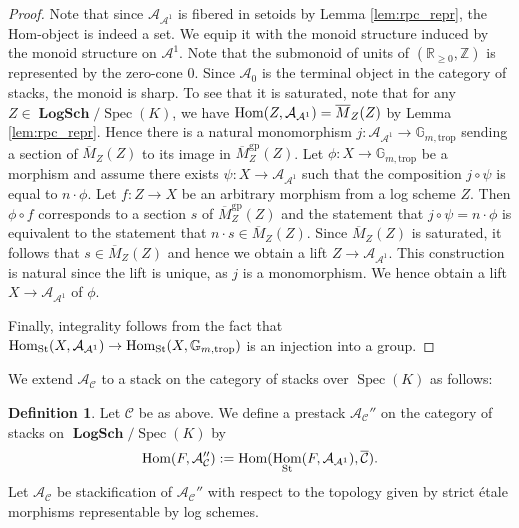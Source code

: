 \documentclass[11pt]{amsart}
\theoremstyle{definition}
\newtheorem{definition}[theorem]{Definition}
\theoremstyle{remark}
\DeclareMathOperator{\Spec}{Spec}
\def\gp{\mathrm{gp}}
\def\trop{\mathrm{trop}}
\DeclareMathOperator{\LogSch}{\mathbf{LogSch}}
\DeclareMathOperator{\Hom}{\textup{Hom}}
\begin{document}
\begin{proof}
	Note that since $\mathcal{A}_{\mathcal{A}^{1}}$ is fibered in
	setoids by Lemma \ref{lem:rpc_repr}, the Hom-object is indeed
	a set. We equip it with the monoid structure induced by
	the monoid structure on $\mathcal{A}^{1}$. Note that the submonoid
	of units of $(\mathbb{R}_{\ge 0},\mathbb{Z})$ is represented by
	the zero-cone $0$. Since $\mathcal{A}_{0}$ is the terminal object
	in the category of stacks, the monoid is sharp. To see that
	it is saturated, note that for any $Z\in \LogSch/\Spec(K)$,
	we have $\Hom(Z,\mathcal{A}_{\mathcal{A}^{1}})=\overline{M}_Z(Z)$
	by Lemma \ref{lem:rpc_repr}. Hence there is a natural monomorphism
	$j:\mathcal{A}_{\mathcal{A}^{1}}\to \mathbb{G}_{m,\trop}$ sending 
	a section of $\overline{M}_Z(Z)$ to its image in
	$\overline{M}^{\gp}_Z(Z)$. Let
	$\phi:X\to \mathbb{G}_{m,\trop}$ be a morphism and assume
	there exists $\psi:X\to \mathcal{A}_{\mathcal{A}^{1}}$ such
	that the composition $j\circ \psi$ is equal to $n\cdot \phi$.
	Let $f:Z\to X$ be an arbitrary morphism from a log scheme $Z$.
	Then $\phi\circ f$ corresponds to a section
	$s$ of $\overline{M}_Z^{\gp}(Z)$ and the statement that $j\circ \psi=n\cdot \phi$
	is equivalent to the statement that $n\cdot s\in \overline{M}_Z(Z)$.
	Since $\overline{M}_Z(Z)$ is saturated, it follows that
	$s\in \overline{M}_Z(Z)$ and hence we obtain a lift
	$Z\to \mathcal{A}_{\mathcal{A}^{1}}$. This construction is natural
	since the lift is unique, as $j$ is a monomorphism. We hence
	obtain a lift $X\to \mathcal{A}_{\mathcal{A}^{1}}$ of $\phi$.

	Finally, integrality follows from the fact that
	$\Hom_{\mathrm{St}}(X,\mathcal{A}_{\mathcal{A}^{1}})\to \Hom_{\mathrm{St}}(X,\mathbb{G}_{m,\trop})$
	is an injection into a group.
\end{proof}

We extend $\mathcal{A}_{\mathcal{C}}$ to a stack on the category of stacks over $\Spec(K)$ as follows:

\begin{definition}
	Let $\mathcal{C}$ be as above.
	We define
	a prestack $\mathcal{A}_{\mathcal{C}}''$ on the category of
	stacks on $\LogSch/\Spec(K)$ by
	$$\Hom(F,\mathcal{A}_{\mathcal{C}}''):=\Hom(\Hom_{\mathrm{St}}(F,\mathcal{A}_{\mathcal{A}^{1}}),\overline{\mathcal{C}}).$$
	Let $\mathcal{A}_{\mathcal{C}}$ be stackification of $\mathcal{A}_{\mathcal{C}}''$ with respect to the topology given by
	strict étale morphisms representable by log schemes.
\end{definition}
\end{document}
